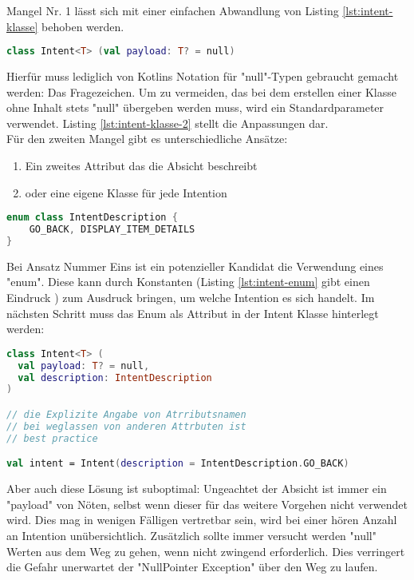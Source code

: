 \bigskip
Mangel Nr. 1 lässt sich mit einer einfachen Abwandlung von Listing
\ref{lst:intent-klasse}
behoben werden. 
\begin{lstlisting}[caption={Intent Klasse}, label={lst:intent-klasse-2}, language=Kotlin]
class Intent<T> (val payload: T? = null)
\end{lstlisting}
\bigskip
Hierfür muss lediglich von Kotlins Notation für "null"-Typen gebraucht gemacht werden: Das Fragezeichen. Um zu vermeiden, das bei dem erstellen einer Klasse ohne Inhalt stets "null" übergeben werden muss, wird ein Standardparameter verwendet. Listing
\ref{lst:intent-klasse-2}
stellt die Anpassungen dar.
\\
Für den zweiten Mangel gibt es unterschiedliche Ansätze:
\begin{enumerate}
	\item Ein zweites Attribut das die Absicht beschreibt
	\item oder eine eigene Klasse für jede Intention
\end{enumerate}
\begin{lstlisting}[caption={Intent Enum}, label={lst:intent-enum}, language=Kotlin]
enum class IntentDescription {
	GO_BACK, DISPLAY_ITEM_DETAILS
}
\end{lstlisting}
\bigskip
Bei Ansatz Nummer Eins ist ein potenzieller Kandidat die Verwendung eines "enum". Diese kann durch Konstanten (Listing 
\ref{lst:intent-enum} gibt einen Eindruck
) zum Ausdruck bringen, um welche Intention es sich handelt. Im nächsten Schritt muss das Enum als Attribut in der Intent Klasse hinterlegt werden:
\begin{lstlisting}[caption={Intent Klasse}, label={lst:intent-klasse-2}, language=Kotlin]
class Intent<T> (
  val payload: T? = null, 
  val description: IntentDescription
)

// die Explizite Angabe von Atrributsnamen
// bei weglassen von anderen Attrbuten ist
// best practice

val intent = Intent(description = IntentDescription.GO_BACK)
\end{lstlisting}
\bigskip
Aber auch diese Lösung ist suboptimal: Ungeachtet der Absicht ist immer ein "payload" von Nöten, selbst wenn dieser für das weitere Vorgehen nicht verwendet wird. Dies mag in wenigen Fälligen vertretbar sein, wird bei einer hören Anzahl an Intention unübersichtlich. Zusätzlich sollte immer versucht werden "null" Werten aus dem Weg zu gehen, wenn nicht zwingend erforderlich. Dies verringert die Gefahr unerwartet der "NullPointer Exception" über den Weg zu laufen.
